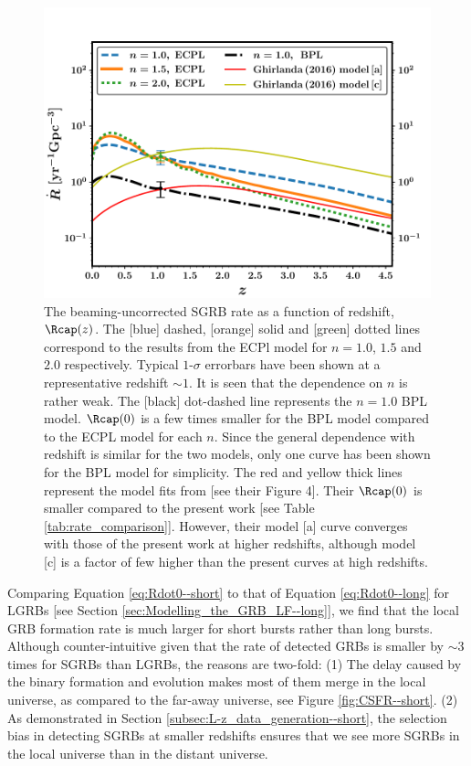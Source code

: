 \begin{figure}
\begin{center}
\includegraphics[scale=0.6]{Rdot_of_z}
\caption[The beaming-uncorrected SGRB rate as a function of redshift]{The beaming-uncorrected SGRB rate as a function of redshift, $\Rcap(z)$. The [blue] dashed, [orange] solid and [green] dotted lines correspond to the results from the ECPl model for $n = 1.0$, $1.5$ and $2.0$ respectively. Typical $1$-$\sigma$ errorbars have been shown at a representative redshift $\sim 1$. It is seen that the dependence on $n$ is rather weak. The [black] dot-dashed line represents the $n = 1.0$ BPL model. $\Rcap(0)$ is a few times smaller for the BPL model compared to the ECPL model for each $n$. Since the general dependence with redshift is similar for the two models, only one curve has been shown for the BPL model for simplicity. The red and yellow thick lines represent the model fits from  [see their Figure 4]. Their $\Rcap(0)$ is smaller compared to the present work [see Table \ref{tab:rate_comparison}]. However, their model [a] curve converges with those of the present work at higher redshifts, although model [c] is a factor of few higher than the present curves at high redshifts.}
\label{fig:Rdot_of_z--short}
\end{center}
\end{figure}


Comparing Equation \ref{eq:Rdot0--short} to that of Equation \ref{eq:Rdot0--long} for LGRBs [see Section \ref{sec:Modelling_the_GRB_LF--long}], we find that the local GRB formation rate is much larger for short bursts rather than long bursts. Although counter-intuitive given that the rate of detected GRBs is smaller by $\sim 3$ times for SGRBs than LGRBs, the reasons are two-fold: (1) The delay caused by the binary formation and evolution makes most of them merge in the local universe, as compared to the far-away universe, see Figure \ref{fig:CSFR--short}. (2) As demonstrated in Section \ref{subsec:L-z_data_generation--short}, the selection bias in detecting SGRBs at smaller redshifts ensures that we see more SGRBs in the local universe than in the distant universe.


